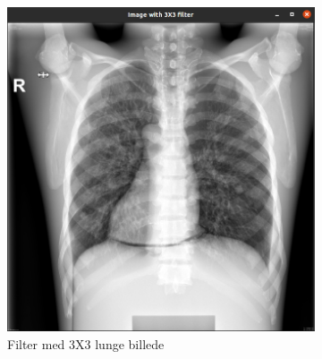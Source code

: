 \documentclass{article}
\begin{document}
\begin{figure}[H]
\begin{subfigure}[b]{0.49\textwidth}
    \includegraphics[width=\textwidth]{Image/Image3X3.png}
    \caption{Filter med 3X3 lunge billede}
    \label{fig:f5}
  \end{subfigure}
      \caption{}
    \label{fig:image2}
\end{figure}
\end{document}

